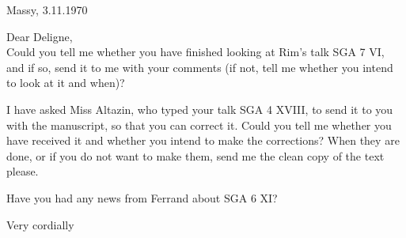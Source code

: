 \begin{flushright}
Massy, 3.11.1970\\
\end{flushright}
Dear Deligne,\\

Could you tell me whether you have finished looking at Rim's talk SGA 7 VI, and if so, send it to me with your comments (if not, tell me whether you intend to look at it and when)?

I have asked Miss Altazin, who typed your talk SGA 4 XVIII, to send it to you with the manuscript, so that you can correct it. Could you tell me whether you have received it and whether you intend to make the corrections? When they are done, or if you do not want to make them, send me the clean copy of the text please.

Have you had any news from Ferrand about SGA 6 XI?

Very cordially\\

